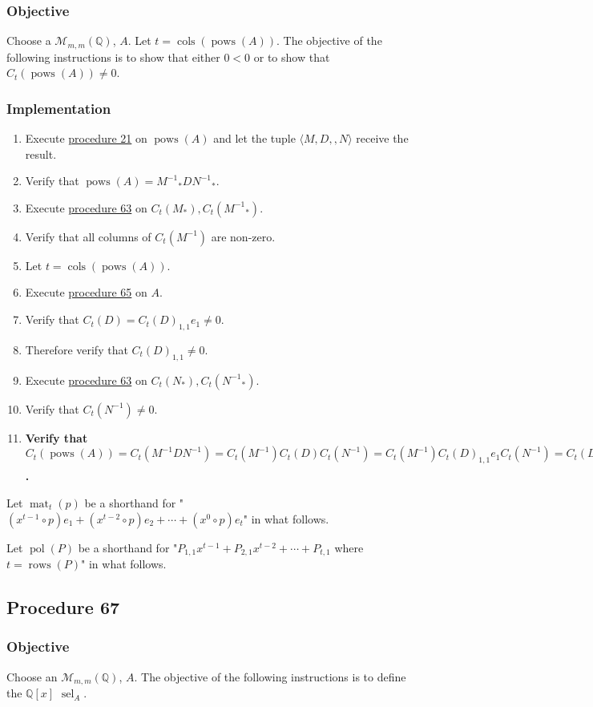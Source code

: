 \documentclass[twocolumn]{article}
\DeclareMathOperator{\mat}{mat}
\DeclareMathOperator{\pol}{pol}
\DeclareMathOperator{\pows}{pows}
\DeclareMathOperator{\cols}{cols}
\DeclareMathOperator{\rows}{rows}
\DeclareMathOperator{\sel}{sel}
\begin{document}
			\subsubsection{Objective}
				Choose a $\mathcal{M}_{m,m}(\mathbb{Q})$, $A$. Let $t=\cols(\pows(A))$. The objective of the following instructions is to show that either $0<0$ or to show that ${C_t(\pows(A))}\ne 0$.
			\subsubsection{Implementation}
				\begin{enumerate}
					\item Execute \hyperref[sec:procedure 21]{procedure 21} on $\pows(A)$ and let the tuple $\langle M,D,,N\rangle$ receive the result.
					\item Verify that $\pows(A)={M^{-1}}_*D{N^{-1}}_*$.
					\item Execute \hyperref[sec:procedure 63]{procedure 63} on $C_t(M_*),C_t({M^{-1}}_*)$.
					\item Verify that all columns of $C_t(M^{-1})$ are non-zero.
					\item Let $t=\cols(\pows(A))$.
					\item Execute \hyperref[sec:procedure 65]{procedure 65} on $A$.
					\item Verify that $C_t(D)={C_t(D)}_{1,1}e_1\ne 0$.
					\item Therefore verify that ${C_t(D)}_{1,1}\ne 0$.
					\item Execute \hyperref[sec:procedure 63]{procedure 63} on $C_t(N_*),C_t({N^{-1}}_*)$.
					\item Verify that $C_t(N^{-1})\ne 0$.
					\item \textbf{Verify that $C_t(\pows(A))=C_t(M^{-1}DN^{-1})=C_t(M^{-1})C_t(D)C_t(N^{-1})=C_t(M^{-1}){C_t(D)}_{1,1}e_1C_t(N^{-1})={C_t(D)}_{1,1}C_t(N^{-1})C_t(M^{-1})e_1\ne 0_{\binom{m^2}{t}\times 1}$.}
				\end{enumerate}
		Let $\mat_t(p)$ be a shorthand for "$(x^{t-1}\circ p)e_1+(x^{t-2}\circ p)e_2+\cdots+(x^0\circ p)e_t$" in what follows.
		
		Let $\pol(P)$ be a shorthand for "$P_{1,1}x^{t-1}+P_{2,1}x^{t-2}+\cdots+P_{t,1}$ where $t=\rows(P)$" in what follows.
		\subsection{Procedure 67}\label{sec:procedure 67}
			\subsubsection{Objective}
				Choose an $\mathcal{M}_{m,m}(\mathbb{Q})$, $A$. The objective of the following instructions is to define the $\mathbb{Q}[x]$ $\sel_A$.
\end{document}
